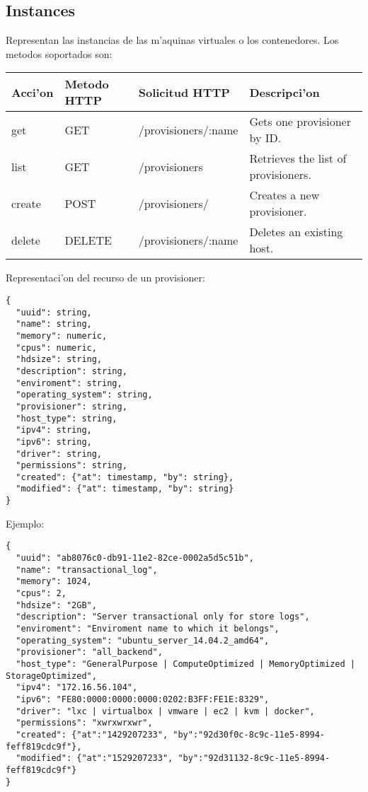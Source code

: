 \subsection{Instances}
Representan las instancias de las m'aquinas virtuales o los contenedores. Los metodos soportados son:

\begin{center}
 \begin{tabular}{| l | l | l | l |}
 \hline
  \rowcolor{blueapi}
  \textbf{Acci'on} & \textbf{Metodo HTTP} & \textbf{Solicitud HTTP} & \textbf{Descripci'on} \\ [0.5ex] 
  \hline\hline
  get & GET & /provisioners/:name & Gets one provisioner by ID. \\
  \hline
  list & GET & /provisioners & Retrieves the list of provisioners. \\
  \hline  
  create & POST & /provisioners/ & Creates a new provisioner. \\
  \hline
  delete & DELETE & /provisioners/:name & Deletes an existing host. \\ [1ex] 
  \hline
\end{tabular}
\end{center}

Representaci'on del recurso de un provisioner:

\medskip
\begin{lstlisting}[style=json]
{
  "uuid": string,
  "name": string,
  "memory": numeric,
  "cpus": numeric,
  "hdsize": string,
  "description": string, 
  "enviroment": string,
  "operating_system": string,
  "provisioner": string,
  "host_type": string,
  "ipv4": string,
  "ipv6": string,
  "driver": string,
  "permissions": string,
  "created": {"at": timestamp, "by": string},
  "modified": {"at": timestamp, "by": string}
}
\end{lstlisting}

Ejemplo:

\medskip
\begin{lstlisting}[style=json]
{
  "uuid": "ab8076c0-db91-11e2-82ce-0002a5d5c51b",
  "name": "transactional_log",
  "memory": 1024,
  "cpus": 2,
  "hdsize": "2GB",
  "description": "Server transactional only for store logs", 
  "enviroment": "Enviroment name to which it belongs",
  "operating_system": "ubuntu_server_14.04.2_amd64",
  "provisioner": "all_backend",
  "host_type": "GeneralPurpose | ComputeOptimized | MemoryOptimized | StorageOptimized",
  "ipv4": "172.16.56.104",
  "ipv6": "FE80:0000:0000:0000:0202:B3FF:FE1E:8329",
  "driver": "lxc | virtualbox | vmware | ec2 | kvm | docker",
  "permissions": "xwrxwrxwr",
  "created": {"at":"1429207233", "by":"92d30f0c-8c9c-11e5-8994-feff819cdc9f"},
  "modified": {"at":"1529207233", "by":"92d31132-8c9c-11e5-8994-feff819cdc9f"}
}
\end{lstlisting}

